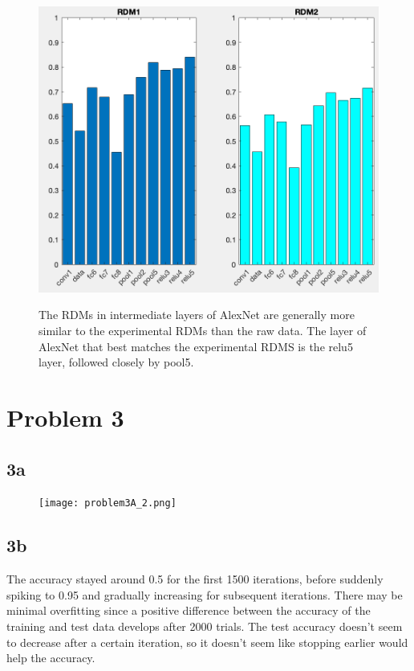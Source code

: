 \documentclass[]{article}
\begin{document}
\begin{figure}[H]
    \centering
    \includegraphics[width=0.7\linewidth]{problem2E_RDMcorrelations.png}
    \label{fig:my_label}
    \caption{The RDMs in intermediate layers of AlexNet are generally more similar to the experimental RDMs than the raw data. The layer of AlexNet that best matches the experimental RDMS is the relu5 layer, followed closely by pool5.}
\end{figure}

\section*{Problem 3}
\subsection*{3a}
\begin{figure}[H]
    \centering
    \texttt{[image: problem3A\_2.png]}
    \label{fig:my_label}
\end{figure}

\subsection*{3b}
The accuracy stayed around 0.5 for the first 1500 iterations, before suddenly spiking to 0.95 and gradually increasing for subsequent iterations. There may be minimal overfitting since a positive difference between the accuracy of the training and test data develops after 2000 trials. The test accuracy doesn't seem to decrease after a certain iteration, so it doesn't seem like stopping earlier would help the accuracy.
\end{document}
